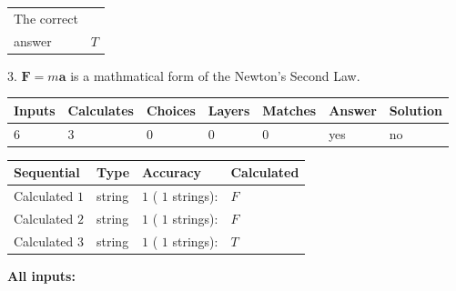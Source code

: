 \documentclass[12pt]{article}
\begin{document}
\noindent\begin{tabular}{|l|l|}\hline The correct & \\
          answer &  %
$T$ \\ \hline \end{tabular}
3.  %
$\mathbf{F}=m\mathbf{a}$ is a mathmatical form of  %
the Newton's Second Law.
 
 
 
\noindent{}
 
 

 
\vspace{0.3in}
   
   
   
   
\noindent\begin{tabular}{|l|l|l|l|l|l|l|}
 \hline
Inputs & Calculates & Choices & Layers & Matches & Answer & Solution \\ \hline
           6  & 
           3  & 
           0
  & 
           0  & 
           0  & 
  yes & 
  no 
  \\ \hline
 \end{tabular}
   
   
   
   
\noindent{}
   
   
  
  
\noindent\begin{tabular}{|l|l|l|l|}
\hline
 Sequential & Type & Accuracy & Calculated \\ 
\hline
 
 
  Calculated $            1 $ & string & $            1  $ ( $           1  $ strings): 
 & $F$
 \\  \hline  
 
 
  Calculated $            2 $ & string & $            1  $ ( $           1  $ strings): 
 & $F$
 \\  \hline  
 
 
  Calculated $            3 $ & string & $            1  $ ( $           1  $ strings): 
 & $T$
 \\  \hline  
 \end{tabular}
   
   
   
   
\noindent\vspace{0.1in}\hspace{-0.08in} {\textbf{\Large{All inputs: }}}
   
\end{document}
